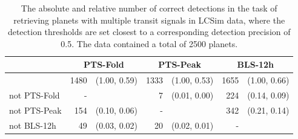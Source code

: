 \begin{table}[h]
\label{tab:single_AnotB}
\centering
\begin{tabular}{@{}lrlrlrl@{}}
\toprule
             & \multicolumn{2}{c}{PTS-Fold} & \multicolumn{2}{c}{PTS-Peak} & \multicolumn{2}{c}{BLS-12h} \\ \midrule
             & 1480      & (1.00, 0.59)     & 1333      & (1.00, 0.53)     & 1655     & (1.00, 0.66)     \\
not PTS-Fold & -         &                  & 7         & (0.01, 0.00)     & 224      & (0.14, 0.09)     \\
not PTS-Peak & 154       & (0.10, 0.06)     & -         &                  & 342      & (0.21, 0.14)     \\
not BLS-12h  & 49        & (0.03, 0.02)     & 20        & (0.02, 0.01)     & -        &                  \\ \bottomrule
\end{tabular}
\caption{The absolute and relative number of correct detections in the task of retrieving planets with multiple transit signals in LCSim data, where the detection thresholds are set closest to a corresponding detection precision of 0.5. The data contained a total of 2500 planets.}
\end{table}